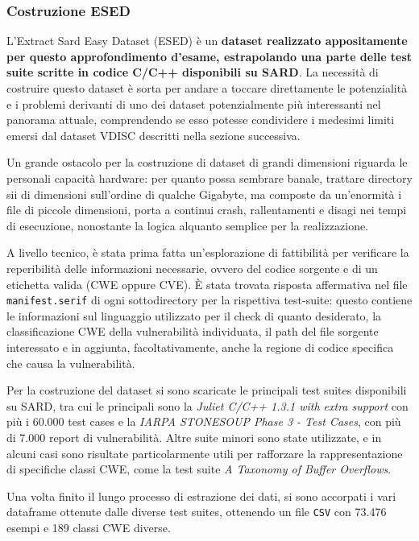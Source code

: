\documentclass[conference]{IEEEtran}
\begin{document}
\subsubsection{Costruzione ESED}
L'Extract Sard Easy Dataset (ESED) è un \textbf{dataset realizzato appositamente per questo approfondimento d'esame, estrapolando una parte delle test suite scritte in codice C/C++ disponibili su SARD}. La necessità di costruire questo dataset è sorta per andare a toccare direttamente le potenzialità e i problemi derivanti di uno dei dataset potenzialmente più interessanti nel panorama attuale, comprendendo se esso potesse condividere i medesimi limiti emersi dal dataset VDISC descritti nella sezione successiva.

Un grande ostacolo per la costruzione di dataset di grandi dimensioni riguarda le personali capacità hardware: per quanto possa sembrare banale, trattare directory sii di dimensioni sull'ordine di qualche Gigabyte, ma composte da un'enormità i file di piccole dimensioni, porta a continui crash, rallentamenti e disagi nei tempi di esecuzione, nonostante la logica alquanto semplice per la realizzazione.

A livello tecnico, è stata prima fatta un'esplorazione di fattibilità per verificare la reperibilità delle informazioni necessarie, ovvero del codice sorgente e di un etichetta valida (CWE oppure CVE). È stata trovata risposta affermativa nel file \texttt{manifest.serif} di ogni sottodirectory per la rispettiva test-suite: questo contiene le informazioni sul linguaggio utilizzato per il check di quanto desiderato, la classificazione CWE della vulnerabilità individuata, il path del file sorgente interessato e in aggiunta, facoltativamente, anche la regione di codice specifica che causa la vulnerabilità.

Per la costruzione del dataset si sono scaricate le principali test suites disponibili su SARD\cite{209211}, tra cui le principali sono la \textit{Juliet C/C++ 1.3.1 with extra support} con più i 60.000 test cases e la \textit{IARPA STONESOUP Phase 3 - Test Cases}, con più di 7.000 report di vulnerabilità. Altre suite minori sono state utilizzate, e in alcuni casi sono risultate particolarmente utili per rafforzare la rappresentazione di specifiche classi CWE, come la test suite \textit{A Taxonomy of Buffer Overflows}. 

Una volta finito il lungo processo di estrazione dei dati, si sono accorpati i vari dataframe ottenute dalle diverse test suites, ottenendo un file \texttt{CSV} con 73.476 esempi e 189 classi CWE diverse. 
\end{document}
